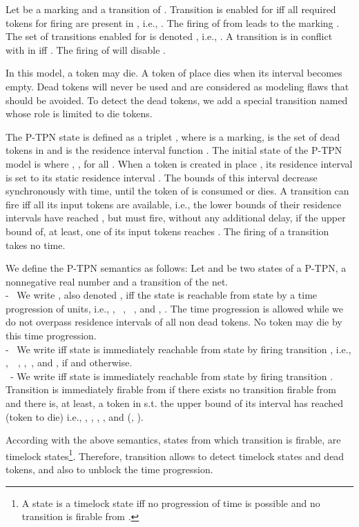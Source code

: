 \documentclass[submission,copyright,creativecommons]{eptcs}
\numberwithin{equation}{section}
\begin{document}
\par Let  be a marking and  a transition
of . Transition  is enabled for  iff all required
tokens for firing  are present in , i.e., . The firing of  from  leads to the marking . The set of transitions enabled for  is denoted ,
i.e., . A transition   is in conflict with  in  iff . The firing of  will disable .
\par In this model, a token may die. A token of place  dies when its interval becomes empty. Dead tokens will never be used and are considered as modeling flaws that should be avoided. To detect the dead tokens, we add a special transition named  whose role is limited to die tokens.
\par The P-TPN state is defined as a triplet , where  is a
marking,  is the set of dead tokens in  and  is the residence interval function . The initial state of the P-TPN
model is  where , ,
for all . When a token is created in place , its residence interval is set to its static residence interval . The bounds of this interval decrease synchronously with time, until the token of  is consumed or dies. A transition
 can fire iff all its input tokens are available, i.e., the lower bounds of their residence intervals have reached
, but must fire, without any additional delay, if the upper
bound of, at least, one of its input tokens reaches . The firing of a transition takes no time.
\par We define the P-TPN semantics as follows: Let  and  be two states of a P-TPN,  a nonnegative real number and  a transition of the net.\\ - \ We write , also denoted , iff the state
  is reachable from  state  by a time progression of
 units, i.e., , \ , \ , and
, .
The time progression is allowed while we do not overpass residence intervals of all non dead tokens. No token may die by this time progression.\\
- \ We write  iff  state  is immediately
reachable from state  by firing transition , i.e.,
,\ \ ,
 ,\ ,
 and ,   if  and  otherwise.\\
 \ - We write  iff  state  is immediately
reachable from state  by firing transition . Transition  is immediately firable from  if there exists no transition firable from  and there is, at least, a token in  s.t. the upper bound of its interval has reached  (token to die) i.e., , ,
 , ,
 and (, ).
\par According with the above semantics, states from which transition  is firable, are timelock states\footnote{A state  is a timelock state iff no progression of time is possible and no transition is firable from .}. Therefore, transition  allows to detect timelock states and dead tokens, and also to unblock the time progression.
\end{document}
